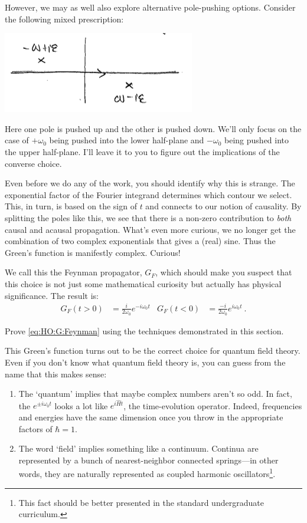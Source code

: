 However, we may as well also explore alternative pole-pushing options. Consider the following mixed prescription:
\begin{center}
\includegraphics[width=.6\textwidth]{figures/Lec_2017_16_Feynman.png}
\end{center}
Here one pole is pushed up and the other is pushed down. We'll only focus on the case of $+\omega_0$ being pushed into the lower half-plane and $-\omega_0$ being pushed into the upper half-plane. I'll leave it to you to figure out the implications of the converse choice.
\begin{example}
Even before we do any of the work, you should identify why this is strange. The exponential factor of the Fourier integrand determines which contour we select. This, in turn, is based on the sign of $t$ and connects to our notion of causality. By splitting the poles like this, we see that there is a non-zero contribution to \emph{both} causal and acausal propagation. What's even more curious, we no longer get the combination of two complex exponentials that gives a (real) sine. Thus the Green's function is manifestly complex. Curious!
\end{example}
We call this the Feynman propagator, $G_F$, which should make you suspect that this choice is not just some mathematical curiosity but actually has physical significance. The result is:
\begin{align}
	G_F(t>0) &= \frac{i}{2\omega_0} e^{-i\omega_0 t}
	&
	G_F(t<0) &= \frac{-i}{2\omega_0} e^{i\omega_0 t} \ .
	\label{eq:HO:G:Feynman}
\end{align}
\begin{exercise}
Prove \eqref{eq:HO:G:Feynman} using the techniques demonstrated in this section.
\end{exercise}
This Green's function turns out to be the correct choice for quantum field theory. Even if you don't know what quantum field theory is, you can guess from the name that this makes sense:
\begin{enumerate}
\item The `quantum' implies that maybe complex numbers aren't so odd. In fact, the $e^{\pm i\omega_0 t}$ looks a lot like $e^{i\hat H t}$, the time-evolution operator. Indeed, frequencies and energies have the same dimension once you throw in the appropriate factors of $\hbar = 1$.
\item The word `field' implies something like a continuum. Continua are represented by a bunch of nearest-neighbor connected springs---in other words, they are naturally represented as coupled harmonic oscillators\footnote{This fact should be better presented in the standard undergraduate curriculum.}.
\end{enumerate}
